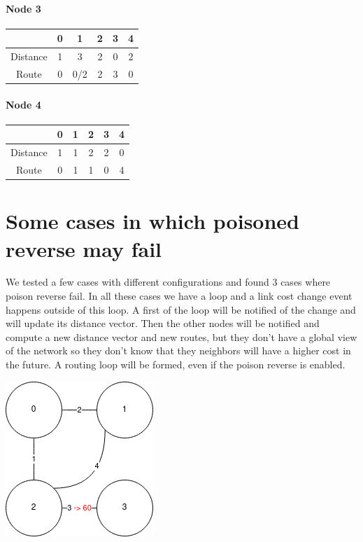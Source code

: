 \documentclass[a4paper,11pt,final]{report}
\begin{document}
\subsubsection{Node 3}

\begin{tabular}{|c|c|c|c|c|c|}
\hline
& 0 & 1 & 2 & 3 & 4 \\ \hline
Distance & 1 & 3 & 2 & 0 & 2 \\ \hline
Route & 0 & 0/2 & 2 & 3 & 0 \\ \hline
\end{tabular}

\subsubsection{Node 4}

\begin{tabular}{|c|c|c|c|c|c|}
\hline
& 0 & 1 & 2 & 3 & 4 \\ \hline
Distance & 1 & 1 & 2 & 2 & 0 \\ \hline
Route & 0 & 1 & 1 & 0 & 4 \\ \hline
\end{tabular}

\chapter{Some cases in which poisoned reverse may fail}

We tested a few cases with different configurations and found 3 cases
where poison reverse fail. In all these cases we have a loop and a link
cost change event happens outside of this loop. A first of the loop will
be notified of the change and will update its distance vector. Then the
other nodes will be notified and compute a new distance vector and new
routes, but they don't have a global view of the network so they don't
know that they neighbors will have a higher cost in the future. A
routing loop will be formed, even if the poison reverse is enabled.

\includegraphics{upload_5c973d56c94fbd7d0646bba45e545d7c.png}
\end{document}
